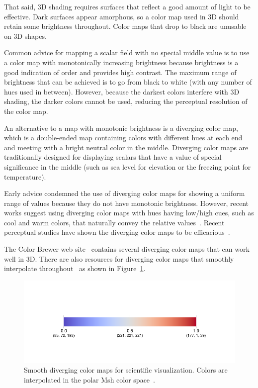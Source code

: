 \documentclass[letterpaper,twocolumn,fleqn]{article}
\newcommand*{\lcite}[1]{~\cite{#1}}
\begin{document}
That said, 3D shading requires surfaces that reflect a good amount of light
to be effective. Dark surfaces appear amorphous, so a color map used in 3D
should retain some brightness throughout. Color maps that drop to black are
unusable on 3D shapes.

Common advice for mapping a scalar field with no special middle value is to
use a color map with monotonically increasing brightness because brightness
is a good indication of order and provides high contrast. The maximum range
of brightness that can be achieved is to go from black to white (with any
number of hues used in between). However, because the darkest colors
interfere with 3D shading, the darker colors cannot be used, reducing the
perceptual resolution of the color map.

An alternative to a map with monotonic brightness is a diverging color map,
which is a double-ended map containing colors with different hues at each
end and meeting with a bright neutral color in the middle. Diverging color
maps are traditionally designed for displaying scalars that have a value of
special significance in the middle (such as sea level for elevation or the
freezing point for temperature).

Early advice condemned the use of diverging color maps for showing a
uniform range of values because they do not have monotonic brightness.
However, recent works suggest using diverging color maps with hues having
low/high cues, such as cool and warm colors, that naturally convey the
relative values\lcite{Moreland2009}. Recent perceptual studies have shown
the diverging color maps to be efficacious\lcite{Borkin2011,Samsel2015}.

The Color Brewer web site\lcite{ColorBrewerURL} contains several diverging color
maps that can work well in 3D. There are also resources for diverging color
maps that smoothly interpolate throughout\lcite{DivergingColorMapURL} as
shown in Figure~\ref{fig:DivergingColorMaps}.

\begin{figure}[htb]
  \centering
  \includegraphics[width=\linewidth,trim=0.7in 0.62in 0.7in 0.85in]
                  {ipython/CoolWarmMap}
  \caption{Smooth diverging color maps for scientific visualization. Colors
    are interpolated in the polar Msh color space\lcite{Moreland2009}.}
  \label{fig:DivergingColorMaps}
\end{figure}
\end{document}
